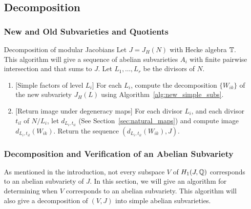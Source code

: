 \documentclass{article}
\begin{document}
\subsection{Decomposition}
\subsubsection{New and Old Subvarieties and Quotients}

\begin{algorithm}{Decomposition of modular Jacobians}%
    \label{alg:decomp_jacobian}
    Let $J=J_H(N)$ with Hecke algebra $\mathbb{T}$. This algorithm will give a sequence
    of abelian subvarieties $A_i$ with finite pairwise intersection and that
    sums to $J$. Let $L_1,\ldots, L_r$ be the divisors of $N$.
    \begin{enumerate}
        \item{} [Simple factors of level $L_i$]
            For each $L_i$, compute the decomposition $\{W_{ik}\}$ of the new
            subvariety $J_H(L)$ using Algorithm~\ref{alg:new_simple_subs}.
        \item{} [Return image under degeneracy maps]
            For each divisor $L_i$, and each divisor $t_{il}$ of $N/L_i$, let
            $d_{L_i, t_{il}}$ (See Section~\ref{sec:natural_maps}) and compute
            image $d_{L_i, t_{il}}(W_{ik})$. Return the sequence $(d_{L_i,
            t_{il}}(W_{ik}), J)$.
    \end{enumerate}
\end{algorithm}

\subsubsection{Decomposition and Verification of an Abelian Subvariety}
\label{sec:decomp_verify}

As mentioned in the introduction, not every subspace $V$ of $H_1(J, \mathbb{Q})$
corresponds to an abelian subvariety of $J$. In this section, we will give an
algorithm for determining when $V$ corresponds to an abelian subvariety. This
algorithm will also give a decomposition of $(V, J)$ into simple abelian
subvarieties. 
\end{document}
